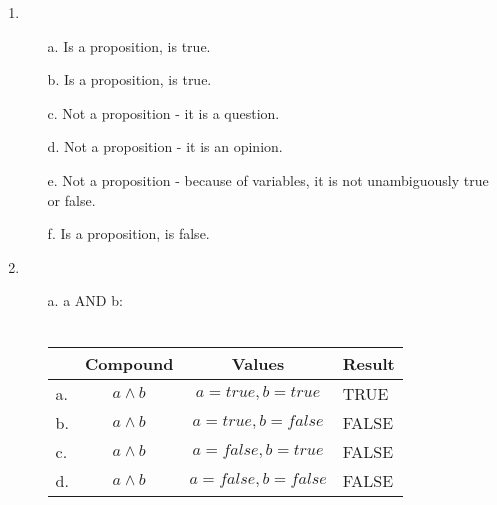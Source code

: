 
\newcommand{\laClass}       {CS 210}
\newcommand{\laSemester}    {Spring 2018}
\newcommand{\laChapter}     {1.3}
\newcommand{\laType}        {Exercise}
\newcommand{\laPoints}      {5}
\newcommand{\laTitle}       {Propositional Logic}
\newcommand{\laDate}        {}
\setcounter{chapter}{1}
\setcounter{section}{3}
\addtocounter{section}{-1}

\toggletrue{answerkey}








    \begin{enumerate}
        \item
            \begin{itemize}
                \item[a.]  Is a proposition, is true.
                \item[b.]  Is a proposition, is true.
                \item[c.]  Not a proposition - it is a question.
                \item[d.]  Not a proposition - it is an opinion.
                \item[e.]  Not a proposition - because of variables, it is not unambiguously true or false.
                \item[f.]  Is a proposition, is false.
            \end{itemize}

        \item
            \begin{itemize}
                \item[a.]   a AND b: ~\\~\\
                    \begin{tabular}{ | l  c | c | p{6cm} | }
                        \hline
                        & \textbf{Compound} & \textbf{Values} & \textbf{Result}
                        \\ \hline

                        a. &        $a \land b$ &       $a = true, b = true$ &       TRUE   \\ \hline
                        b. &        $a \land b$ &       $a = true, b = false$ &       FALSE   \\ \hline
                        c. &        $a \land b$ &       $a = false, b = true$ &       FALSE   \\ \hline
                        d. &        $a \land b$ &       $a = false, b = false$ &       FALSE   \\ \hline
                    \end{tabular}
                    

\end{itemize}
\end{enumerate}
